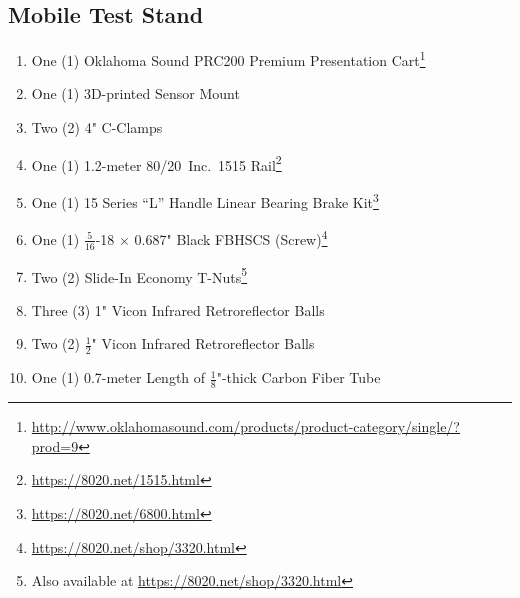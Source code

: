 \subsection{Mobile Test Stand}
\begin{enumerate}
\item One (1) Oklahoma Sound PRC200 Premium Presentation Cart\footnote{\url{http://www.oklahomasound.com/products/product-category/single/?prod=9}}
\item One (1) 3D-printed Sensor Mount
\item Two (2) 4" C-Clamps
\item One (1) 1.2-meter 80/20\textsuperscript{\textregistered}~Inc.\ 1515 Rail\footnote{\url{https://8020.net/1515.html}}
\item One (1) 15 Series ``L'' Handle Linear Bearing Brake Kit\footnote{\url{https://8020.net/6800.html}}
\item One (1) $\frac{5}{16}$-18 $\times$ 0.687" Black FBHSCS (Screw)\footnote{\url{https://8020.net/shop/3320.html}}
\item Two (2) Slide-In Economy T-Nuts\footnote{Also available at \url{https://8020.net/shop/3320.html}}
\item Three (3) 1" Vicon Infrared Retroreflector Balls
\item Two (2) $\frac{1}{2}$" Vicon Infrared Retroreflector Balls
\item One (1) 0.7-meter Length of $\frac{1}{8}$"-thick Carbon Fiber Tube
\end{enumerate}
\pagebreak
